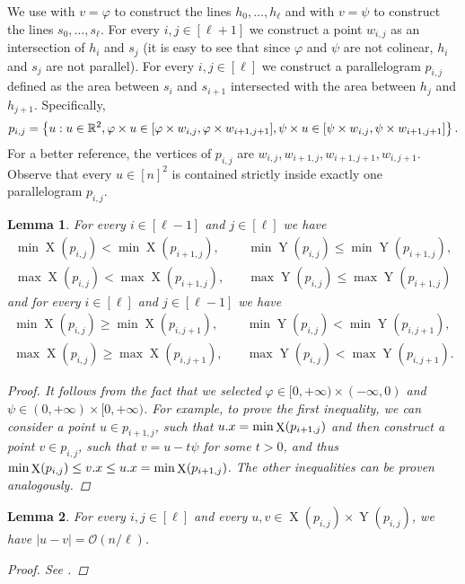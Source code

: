 \documentclass[11pt]{article}
\newcommand{\R}{\mathbb{R}}
\renewcommand{\O}{\mathcal{O}}
\renewcommand{\phi}{\varphi}
\newcommand{\set}[1]{\left\lbrace #1 \right\rbrace}
\newcommand{\eq}[1]{\begin{align*} #1 \end{align*}}
\theoremstyle{plain}
\newtheorem{lemma}{Lemma}
\theoremstyle{definition}
\theoremstyle{remark}
\DeclareMathOperator*{\X}{X}
\DeclareMathOperator*{\Y}{Y}
\begin{document}
We use  with $v = \phi$ to construct the lines $h_0, \dots, h_\ell$ and with $v = \psi$ to construct the lines $s_0, \dots, s_\ell$.
For every $i, j \in [\ell + 1]$ we construct a point $w_{i, j}$ as an intersection of $h_i$ and $s_j$ (it is easy to see that since $\phi$ and $\psi$ are not colinear, $h_i$ and $s_j$ are not parallel).
For every $i, j \in [\ell]$ we construct a parallelogram $p_{i, j}$ defined as the area between $s_i$ and $s_{i + 1}$ intersected with the area between $h_j$ and $h_{j + 1}$.
Specifically,
$$p_{i, j} = \set{u : u \in \R^2, \h{u} \in [\h{w_{i, j}}, \h{w_{i + 1, j + 1}}], \s{u} \in [\s{w_{i, j}}, \s{w_{i + 1, j + 1}}]}.$$
For a better reference, the vertices of $p_{i, j}$ are $w_{i, j}, w_{i + 1, j}, w_{i + 1, j + 1}, w_{i, j + 1}$.
Observe that every $u \in [n]^2$ is contained strictly inside exactly one parallelogram $p_{i, j}$.

\begin{lemma}\label{monotonicity_lemma}
	For every $i \in [\ell - 1]$ and $j \in [\ell]$ we have
	\eq{
	\min \X(p_{i, j}) < \min \X(p_{i + 1, j}), \quad
	&\min \Y(p_{i, j}) \le \min \Y(p_{i + 1, j}), \\
	\max \X(p_{i, j}) < \max \X(p_{i + 1, j}), \quad
	&\max \Y(p_{i, j}) \le \max \Y(p_{i + 1, j})
	}
	and for every $i \in [\ell]$ and $j \in [\ell - 1]$ we have
	\eq{
		\min \X(p_{i, j}) \ge \min \X(p_{i, j + 1}), \quad
		&\min \Y(p_{i, j}) < \min \Y(p_{i, j + 1}), \\
		\max \X(p_{i, j}) \ge \max \X(p_{i, j + 1}), \quad
		&\max \Y(p_{i, j}) < \max \Y(p_{i, j + 1}).
	}
	\begin{proof}
		It follows from the fact that we selected $\phi \in [0, +\infty) \times (-\infty, 0)$ and $\psi \in (0, +\infty) \times [0, +\infty)$.
		For example, to prove the first inequality, we can consider a point $u \in p_{i + 1, j}$, such that $\x{u} = \min \X(p_{i + 1, j})$
		and then construct a point $v \in p_{i, j}$, such that $v = u - t\psi$ for some $t > 0$, and thus $\min \X(p_{i, j}) \le \x{v} \le \x{u} = \min \X(p_{i + 1, j})$.
		The other inequalities can be proven analogously.
	\end{proof}
\end{lemma}

\begin{lemma}\label{distance_bound_lemma}
	For every $i, j \in [\ell]$ and every $u, v \in \X(p_{i, j}) \times \Y(p_{i, j})$, we have $|u - v| = \O(n / \ell)$.
	\begin{proof} See . \end{proof}
\end{lemma}
\end{document}
